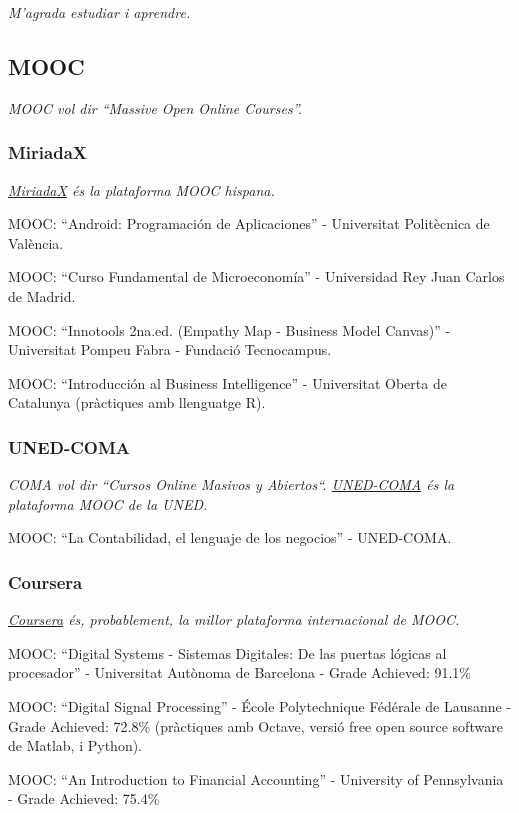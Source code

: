 \documentclass[11pt]{article}
\begin{document}
\emph{M'agrada estudiar i aprendre.}
\subsection{MOOC}
\label{sec-3-1}

\emph{MOOC vol dir ``Massive Open Online Courses''.}
\subsubsection{MiriadaX}
\label{sec-3-1-1}

\emph{\href{https://www.miriadax.net/}{MiriadaX} és la plataforma MOOC hispana.}

MOOC: “Android: Programación de Aplicaciones” - Universitat Politècnica de València.

MOOC: “Curso Fundamental de Microeconomía” - Universidad Rey Juan Carlos de Madrid.

MOOC: ``Innotools 2na.ed. (Empathy Map - Business Model Canvas)'' - Universitat Pompeu Fabra - Fundació Tecnocampus.

MOOC: ``Introducción al Business Intelligence'' - Universitat Oberta de Catalunya (pràctiques amb llenguatge R).
\subsubsection{UNED-COMA}
\label{sec-3-1-2}

\emph{COMA vol dir “Cursos Online Masivos y Abiertos“. \hyperref[https-coma.uned.es]{UNED-COMA} és la plataforma MOOC de la UNED.}

MOOC: “La Contabilidad, el lenguaje de los negocios” - UNED-COMA.
\subsubsection{Coursera}
\label{sec-3-1-3}

\emph{\href{https://www.coursera.org/}{Coursera} és, probablement, la millor plataforma internacional de MOOC.}

MOOC: ``Digital Systems - Sistemas Digitales: De las puertas lógicas al procesador'' - Universitat Autònoma de Barcelona - Grade Achieved: 91.1\%

MOOC: ``Digital Signal Processing'' - École Polytechnique Fédérale de Lausanne - Grade Achieved: 72.8\% (pràctiques amb Octave, versió free open source software de Matlab, i Python).

MOOC: ``An Introduction to Financial Accounting'' - University of Pennsylvania - Grade Achieved: 75.4\%
\end{document}
